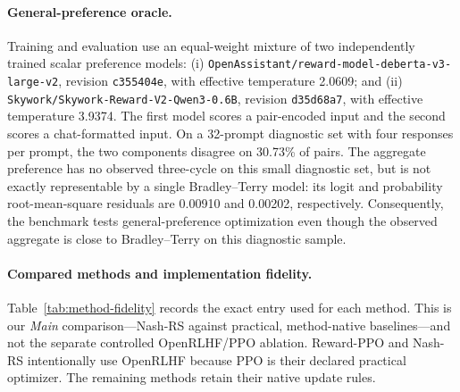 \paragraph{General-preference oracle.}
Training and evaluation use an equal-weight mixture of two independently
trained scalar preference models: (i)
\texttt{OpenAssistant/reward-model-deberta-v3-large-v2}, revision
\texttt{c355404e}, with effective temperature 2.0609; and (ii)
\texttt{Skywork/Skywork-Reward-V2-Qwen3-0.6B}, revision
\texttt{d35d68a7}, with effective temperature 3.9374.  The first model scores a
pair-encoded input and the second scores a chat-formatted input.  On a
32-prompt diagnostic set with four responses per prompt, the two components
disagree on 30.73\% of pairs.  The aggregate preference has no observed
three-cycle on this small diagnostic set, but is not exactly representable by
a single Bradley--Terry model: its logit and probability root-mean-square
residuals are 0.00910 and 0.00202, respectively.  Consequently, the benchmark
tests general-preference optimization even though the observed aggregate is
close to Bradley--Terry on this diagnostic sample.

\paragraph{Compared methods and implementation fidelity.}
Table~\ref{tab:method-fidelity} records the exact entry used for each method.
This is our \emph{Main} comparison---Nash-RS against practical,
method-native baselines---and not the separate controlled OpenRLHF/PPO
ablation.  Reward-PPO and Nash-RS intentionally use OpenRLHF because PPO is
their declared practical optimizer.  The remaining methods retain their
native update rules.

\begin{table}[t]
  \centering
  \caption{Method-native implementations used in the current experiments.}
  \label{tab:method-fidelity}
  \small
\end{table}

